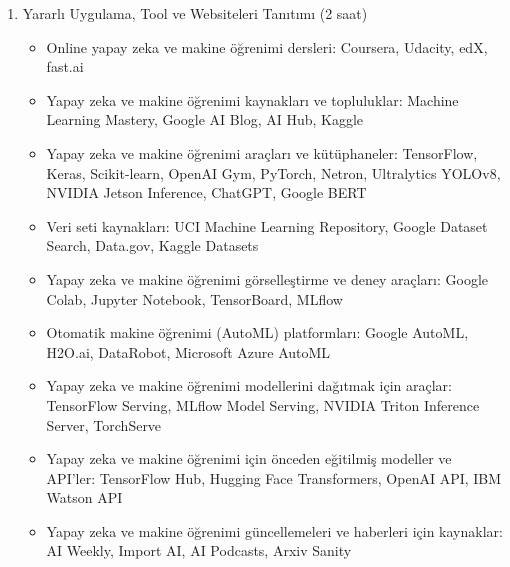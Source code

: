 \documentclass[12pt]{article}
\begin{document}
\begin{enumerate}
    \item Yararlı Uygulama, Tool ve Websiteleri Tanıtımı (2 saat)
    \begin{itemize}
        \item Online yapay zeka ve makine öğrenimi dersleri: Coursera, Udacity, edX, fast.ai
        \item Yapay zeka ve makine öğrenimi kaynakları ve topluluklar: Machine Learning Mastery, Google AI Blog, AI Hub, Kaggle
        \item Yapay zeka ve makine öğrenimi araçları ve kütüphaneler: TensorFlow, Keras, Scikit-learn, OpenAI Gym, PyTorch, Netron, Ultralytics YOLOv8, NVIDIA Jetson Inference, ChatGPT, Google BERT
        \item Veri seti kaynakları: UCI Machine Learning Repository, Google Dataset Search, Data.gov, Kaggle Datasets
        \item Yapay zeka ve makine öğrenimi görselleştirme ve deney araçları: Google Colab, Jupyter Notebook, TensorBoard, MLflow
        \item Otomatik makine öğrenimi (AutoML) platformları: Google AutoML, H2O.ai, DataRobot, Microsoft Azure AutoML
        \item Yapay zeka ve makine öğrenimi modellerini dağıtmak için araçlar: TensorFlow Serving, MLflow Model Serving, NVIDIA Triton Inference Server, TorchServe
        \item Yapay zeka ve makine öğrenimi için önceden eğitilmiş modeller ve API'ler: TensorFlow Hub, Hugging Face Transformers, OpenAI API, IBM Watson API
        \item Yapay zeka ve makine öğrenimi güncellemeleri ve haberleri için kaynaklar: AI Weekly, Import AI, AI Podcasts, Arxiv Sanity
    \end{itemize}


\end{enumerate}
\end{document}
